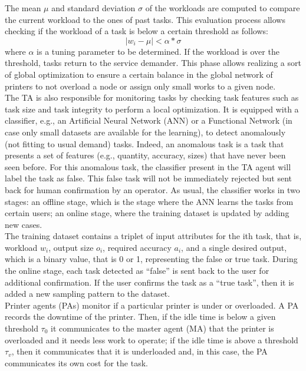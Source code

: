 The mean $\mu$ and standard deviation $\sigma$  of the workloads are computed to compare the current workload to the ones of past tasks. This evaluation process allows checking if the workload of a task is below a certain threshold as follows:
\begin{equation}
    \label{eq:10}
    |w_i - \mu| < \alpha * \sigma
\end{equation}
where $\alpha$ is a tuning parameter to be determined.
If the workload is over the threshold, tasks return to the service demander. This phase allows realizing a sort of global optimization to ensure a certain balance in the global network of printers to not overload a node or assign only small works to a given node.\\
The TA is also responsible for monitoring tasks by checking task features such as task size and task integrity to perform a local optimization. It is equipped with a classifier, e.g., an Artificial Neural Network (ANN) or a Functional Network \parencite{gaeta_generalized_2013} \parencite{cha_multi-agent_2015} (in case only small datasets are available for the learning), to detect anomalously (not fitting to usual demand) tasks. Indeed, an anomalous task is a task that presents a set of features (e.g., quantity, accuracy, sizes) that have never been seen before. For this anomalous task, the classifier present in the TA agent will label the task as false. This false task will not be immediately rejected but sent back for human confirmation by an operator. As usual, the classifier works in two stages: an offline stage, which is the stage where the ANN learns the tasks from certain users; an online stage, where the training dataset is updated by adding new cases.\\
The training dataset contains a triplet of input attributes for the ith task, that is, workload $w_i$, output size $o_i$, required accuracy $a_i$, and a single desired output, which is a binary value, that is 0 or 1, representing the false or true task. During the online stage, each task detected as “false” is sent back to the user for additional confirmation. If the user confirms the task as a “true task”, then it is added a new sampling pattern to the dataset.\\
Printer agents (PAs) monitor if a particular printer is under or overloaded. A PA records the downtime of the printer. Then, if the idle time is below a given threshold $\tau_0$ it communicates to the master agent (MA) that the printer is overloaded and it needs less work to operate; if the idle time is above a threshold $\tau_v$, then it communicates that it is underloaded and, in this case, the PA communicates its own cost for the task.\\
